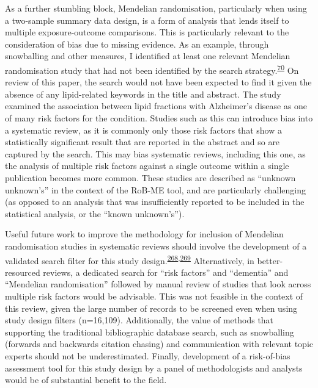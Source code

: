 \documentclass[a4paper, twoside]{templates/ociamthesis}
\begin{document}
As a further stumbling block, Mendelian randomisation, particularly when using a two-sample summary data design, is a form of analysis that lends itself to multiple exposure-outcome comparisons. This is particularly relevant to the consideration of bias due to missing evidence. As an example, through snowballing and other measures, I identified at least one relevant Mendelian randomisation study that had not been identified by the search strategy.\textsuperscript{\protect\hyperlink{ref-larsson2017}{70}} On review of this paper, the search would not have been expected to find it given the absence of any lipid-related keywords in the title and abstract. The study examined the association between lipid fractions with Alzheimer's disease as one of many risk factors for the condition. Studies such as this can introduce bias into a systematic review, as it is commonly only those risk factors that show a statistically significant result that are reported in the abstract and so are captured by the search. This may bias systematic reviews, including this one, as the analysis of multiple risk factors against a single outcome within a single publication becomes more common. These studies are described as ``unknown unknown's'' in the context of the RoB-ME tool, and are particularly challenging (as opposed to an analysis that was insufficiently reported to be included in the statistical analysis, or the ``known unknown's'').

Useful future work to improve the methodology for inclusion of Mendelian randomisation studies in systematic reviews should involve the development of a validated search filter for this study design.\textsuperscript{\protect\hyperlink{ref-waffenschmidt2020}{268},\protect\hyperlink{ref-wagner2020}{269}} Alternatively, in better-resourced reviews, a dedicated search for ``risk factors'' and ``dementia'' and ``Mendelian randomisation'' followed by manual review of studies that look across multiple risk factors would be advisable. This was not feasible in the context of this review, given the large number of records to be screened even when using study design filters (n=16,109). Additionally, the value of methods that supporting the traditional bibliographic database search, such as snowballing (forwards and backwards citation chasing) and communication with relevant topic experts should not be underestimated. Finally, development of a risk-of-bias assessment tool for this study design by a panel of methodologists and analysts would be of substantial benefit to the field.
\end{document}
